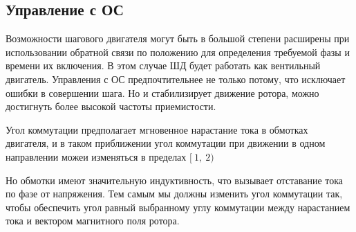 \newpage
\subsection{ Управление с ОС }
Возможности шагового двигателя могут быть в большой степени расширены при использовании обратной
связи по положению для определения требуемой фазы и времени их включения. В этом случае ШД будет
работать как вентильный двигатель. Управления с ОС предпочтительнее не только потому, что исключает
ошибки в совершении шага. Но и стабилизирует движение ротора, можно достигнуть более высокой
частоты приемистости.

Угол коммутации предполагает мгновенное нарастание тока в обмотках двигателя, и в таком приближении
угол коммутации при движении в одном направлении можеи изменяться в пределах $[~1,~2)$

Но обмотки имеют значительную индуктивность, что вызывает отставание тока по фазе от напряжения.
Тем самым мы должны изменить угол коммутации так, чтобы обеспечить угол равный выбранному углу
коммутации между нарастанием тока и вектором магнитного поля ротора.

